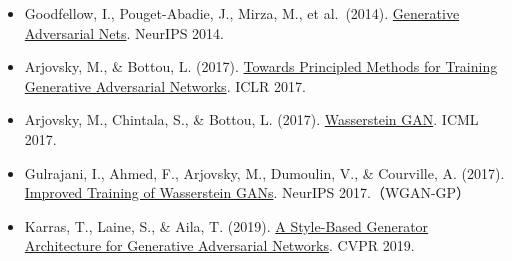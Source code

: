 \vspace{0.25em}
\begin{itemize}
\tightlist
\item
  Goodfellow, I., Pouget-Abadie, J., Mirza, M., et al.~(2014). \href{https://papers.nips.cc/paper/5423-generative-adversarial-nets}{Generative Adversarial Nets}. NeurIPS 2014.
\item
  Arjovsky, M., \& Bottou, L. (2017). \href{https://arxiv.org/abs/1701.04862}{Towards Principled Methods for Training Generative Adversarial Networks}. ICLR 2017.
\item
  Arjovsky, M., Chintala, S., \& Bottou, L. (2017). \href{https://arxiv.org/abs/1701.07875}{Wasserstein GAN}. ICML 2017.
\item
  Gulrajani, I., Ahmed, F., Arjovsky, M., Dumoulin, V., \& Courville, A. (2017). \href{https://proceedings.neurips.cc/paper/2017/hash/892c3b1c6dccd52936e27cbd0ff683d6-Abstract.html}{Improved Training of Wasserstein GANs}. NeurIPS 2017.（WGAN-GP）
\item
  Karras, T., Laine, S., \& Aila, T. (2019). \href{https://openaccess.thecvf.com/content_CVPR_2019/html/Karras_A_Style-Based_Generator_Architecture_for_Generative_Adversarial_Networks_CVPR_2019_paper.html}{A Style-Based Generator Architecture for Generative Adversarial Networks}. CVPR 2019.
\end{itemize}

\clearpage
